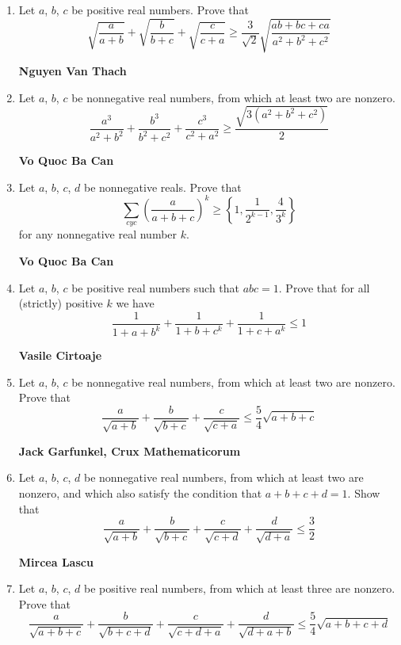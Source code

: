 \documentclass{article}
\begin{document}
\begin{enumerate}
\pagebreak

\item Let $a$, $b$, $c$ be positive real numbers. Prove that$$\sqrt{\frac{a}{a+b}}+\sqrt{\frac{b}{b+c}}+\sqrt{\frac{c}{c+a}}\geq \frac{3}{\sqrt{2}}\sqrt{\frac{ab+bc+ca}{a^2+b^2+c^2}}$$
\begin{flushright}
	\textbf{Nguyen Van Thach}
\end{flushright}
\item Let $a$, $b$, $c$ be nonnegative real numbers, from which at least two are nonzero.$$\frac{a^3}{a^2+b^2}+\frac{b^3}{b^2+c^2}+\frac{c^3}{c^2+a^2}\geq \frac{\sqrt{3\left(a^2+b^2+c^2 \right) }}{2}$$
\begin{flushright}
	\textbf{Vo Quoc Ba Can}
\end{flushright}
\item Let $a$, $b$, $c$, $d$ be nonnegative reals. Prove that$$\sum \limits_{cyc} \left(\frac{a}{a+b+c} \right)^k\geq \left\{1,\frac{1}{2^{k-1}},\frac{4}{3^k}\right\}  $$
for any nonnegative real number $k$.
\begin{flushright}
	\textbf{Vo Quoc Ba Can}
\end{flushright}
\item Let $a$, $b$, $c$ be positive real numbers such that $abc = 1$. Prove that for all (strictly) positive $k$ we have$$\frac{1}{1+a+b^k}+\frac{1}{1+b+c^k}+\frac{1}{1+c+a^k}\leq 1$$
\begin{flushright}
	\textbf{Vasile Cirtoaje}
\end{flushright}
\item Let $a$, $b$, $c$ be nonnegative real numbers, from which at least two are nonzero. Prove that$$\frac{a}{\sqrt{a+b}}+\frac{b}{\sqrt{b+c}}+\frac{c}{\sqrt{c+a}}\leq \frac{5}{4}\sqrt{a+b+c}$$
\begin{flushright}
	\textbf{Jack Garfunkel, Crux Mathematicorum}
\end{flushright}
\item Let $a$, $b$, $c$, $d$ be nonnegative real numbers, from which at least two are nonzero, and which also satisfy the condition that $a + b + c + d = 1$. Show that$$\frac{a}{\sqrt{a+b}}+\frac{b}{\sqrt{b+c}}+\frac{c}{\sqrt{c+d}}+\frac{d}{\sqrt{d+a}}\leq \frac{3}{2}$$
\begin{flushright}
	\textbf{Mircea Lascu}
\end{flushright}
\item Let $a$, $b$, $c$, $d$ be positive real numbers, from which at least three are nonzero. Prove that$$\frac{a}{\sqrt{a+b+c}}+\frac{b}{\sqrt{b+c+d}}+\frac{c}{\sqrt{c+d+a}}+\frac{d}{\sqrt{d+a+b}}\leq \frac{5}{4}\sqrt{a+b+c+d}$$

\end{enumerate}
\end{document}
